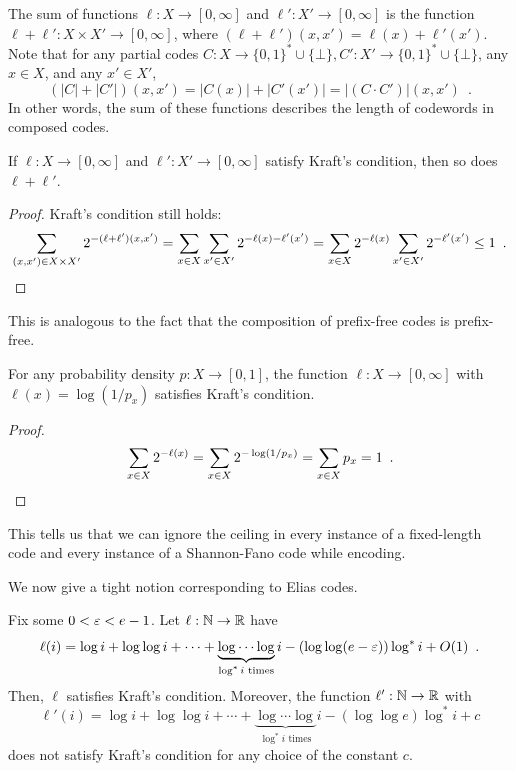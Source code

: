 \documentclass{patmorin}
\begin{document}
The sum of functions $\ell : X \to [0, \infty]$ and $\ell' : X' \to
[0, \infty]$ is the function $\ell + \ell' : X \times X' \to [0,
\infty]$, where $(\ell + \ell') (x, x') = \ell(x) + \ell'(x')$. Note
that for any partial codes $C : X \to \{0, 1\}^* \cup \{\bot\}, C' :
X' \to \{0, 1\}^* \cup \{\bot\}$, any $x \in X$, and any $x' \in X'$,
\[
(|C| + |C'|)(x, x') = |C(x)| + |C'(x')| = |(C \cdot C')|(x, x') \enspace .
\]
In other words, the sum of these functions describes the length of
codewords in composed codes.

\begin{lem}
  If $\ell : X \to [0, \infty]$ and $\ell' : X' \to [0,
  \infty]$ satisfy Kraft's condition, then so does $\ell + \ell'$.
\end{lem}
\begin{proof}
  Kraft's condition still holds:
  \[
  \sum_{(x, x') \in X \times X'} 2^{-(\ell + \ell')(x, x')} = \sum_{x
    \in X} \sum_{x' \in X'} 2^{-\ell(x) - \ell'(x')} = \sum_{x \in X}
  2^{-\ell(x)} \sum_{x' \in X'} 2^{-\ell'(x')} \leq 1 \enspace
  . \qedhere
  \]
\end{proof}
This is analogous to the fact that the composition of prefix-free
codes is prefix-free.

\begin{lem}
  For any probability density $p : X \to [0, 1]$, the function
  $\ell : X \to [0, \infty]$ with $\ell(x) = \log (1/p_x)$
  satisfies Kraft's condition.
\end{lem}
\begin{proof}
  \[
  \sum_{x \in X} 2^{-\ell(x)} = \sum_{x \in X} 2^{-\log (1/p_x)} =
  \sum_{x \in X} p_x = 1 \enspace . \qedhere
  \]
\end{proof}
This tells us that we can ignore the ceiling in every instance of a
fixed-length code and every instance of a Shannon-Fano code while
encoding.

We now give a tight notion corresponding to Elias codes.
\begin{thm}
  Fix some $0 < \varepsilon < e - 1$. Let $\ell : \mathbb{N} \to \mathbb{R}$ have
  \[
  \ell(i) = \log i + \log \log i + \cdots + \underbrace{\log \cdots
    \log}_{\text{$\log^* i$ times}} i - (\log \log (e - \varepsilon)) \log^*
  i + O(1) \enspace .
  \]
  Then, $\ell$ satisfies Kraft's condition. Moreover, the function
  $\ell' : \mathbb{N} \to \mathbb{R}$ with
  \[
  \ell'(i) = \log i + \log \log i + \cdots + \underbrace{\log \cdots
    \log}_{\text{$\log^* i$ times}} i - (\log \log e) \log^* i + c
  \]
  does not satisfy Kraft's condition for any choice of the constant
  $c$.
\end{thm}
\end{document}

